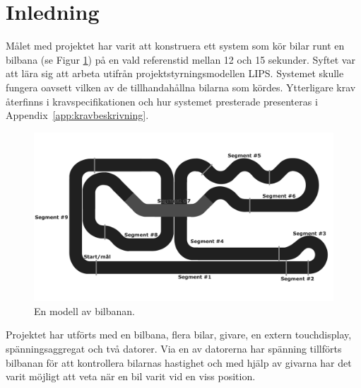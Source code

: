 \section{Inledning}

Målet med projektet har varit att konstruera ett system som kör bilar runt en
bilbana (se Figur \ref{fig:bilbanan}) på en vald referenstid mellan 12 och 15
sekunder. Syftet var att lära sig att arbeta utifrån projektstyrningsmodellen
LIPS. Systemet skulle fungera oavsett vilken av de tillhandahållna bilarna som
kördes. Ytterligare krav återfinns i kravspecifikationen och hur systemet
presterade presenteras i Appendix~\ref{app:kravbeskrivning}.

\begin{figure}
	\centering
	\includegraphics[width=\linewidth] {Figures/BanaModell}
	\caption{En modell av bilbanan.}
	\label{fig:bilbanan}
\end{figure} 

Projektet har utförts med
en bilbana, flera bilar, givare, en extern touchdisplay, spänningsaggregat och
två datorer. Via en av datorerna har spänning tillförts bilbanan för att
kontrollera bilarnas hastighet och med hjälp av givarna har det varit möjligt
att veta när en bil varit vid en viss position.

